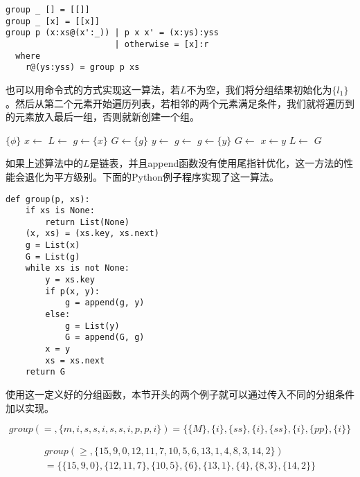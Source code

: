 \documentclass[UTF8]{article}
\begin{document}
\lstset{language=Haskell}
\begin{lstlisting}
group _ [] = [[]]
group _ [x] = [[x]]
group p (x:xs@(x':_)) | p x x' = (x:ys):yss
                      | otherwise = [x]:r
  where
    r@(ys:yss) = group p xs
\end{lstlisting}

也可以用命令式的方式实现这一算法，若$L$不为空，我们将分组结果初始化为$\{{l_1\}}$。然后从第二个元素开始遍历列表，若相邻的两个元素满足条件，我们就将遍历到的元素放入最后一组，否则就新创建一个组。

\begin{algorithmic}[1]
    \State \Return $\{ \phi \}$
  \EndIf
  \State $x \gets$ 
  \State $L \gets$ 
  \State $g \gets \{ x \}$
  \State $G \gets \{ g \}$
    \State $y \gets$ 
      \State $g \gets $ 
    \Else
      \State $g \gets \{y\}$
      \State $G \gets$ 
    \EndIf
    \State $x \gets y$
    \State $L \gets$ 
  \EndWhile
  \State \Return $G$
\EndFunction
\end{algorithmic}

如果上述算法中的$L$是链表，并且append函数没有使用尾指针优化，这一方法的性能会退化为平方级别。下面的Python例子程序实现了这一算法。

\lstset{language=Python}
\begin{lstlisting}
def group(p, xs):
    if xs is None:
        return List(None)
    (x, xs) = (xs.key, xs.next)
    g = List(x)
    G = List(g)
    while xs is not None:
        y = xs.key
        if p(x, y):
            g = append(g, y)
        else:
            g = List(y)
            G = append(G, g)
        x = y
        xs = xs.next
    return G
\end{lstlisting}

使用这一定义好的分组函数，本节开头的两个例子就可以通过传入不同的分组条件加以实现。

\[
group(=, \{m,i,s,s,i,s,s,i,p,p,i\}) = \{ \{M\}, \{i\}, \{ss\}, \{i\}, \{ss\}, \{i\}, \{pp\}, \{i\} \}
\]

\[
\begin{array}{l}
group(\geq,  \{15, 9, 0, 12, 11, 7, 10, 5, 6, 13, 1, 4, 8, 3, 14, 2\}) \\
  = \{ \{15, 9, 0\}, \{12, 11, 7\}, \{10, 5\}, \{6\}, \{13, 1\}, \{4\}, \{8, 3\}, \{14, 2\}\}
\end{array}
\]
\end{document}
